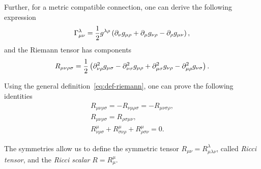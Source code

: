 Further, for a metric compatible connection, one can derive the following expression
\begin{equation}
    \Gamma^\lambda_{\mu\nu} = \frac{1}{2} g^{\lambda\rho} \left( \partial_\nu g_{\mu\rho} + \partial_\mu g_{\nu\rho} - \partial_\rho g_{\mu\nu} \right),
\end{equation}
and the Riemann tensor has components
\begin{equation}
    R_{\mu\nu\rho\sigma} = \frac{1}{2} \left( {\partial}^2_{\nu\rho} g_{\mu\sigma} - {\partial}^2_{\nu\sigma} g_{\mu\rho} + {\partial}^2_{\mu\sigma} g_{\nu\rho} - {\partial}^2_{\mu\rho} g_{\nu\sigma} \right) .
\end{equation}

Using the general definition~\eqref{eq:def-riemann}, one can prove the following identities
\begin{subequations}
\begin{gather}
    R_{\mu\nu\rho\sigma} = - R_{\nu\mu\rho\sigma} = - R_{\mu\nu\sigma\rho}, \\
    R_{\mu\nu\rho\sigma} = R_{\rho\sigma\mu\nu}, \\
    R^\mu_{\nu\rho\sigma} + R^\mu_{\sigma\nu\rho} + R^\mu_{\rho\sigma\nu} = 0.
\end{gather}
\end{subequations}

The symmetries allow us to define the symmetric tensor $R_{\mu\nu} = R^\lambda_{\mu\lambda\nu}$, called \emph{Ricci tensor}, and the \emph{Ricci scalar} $R = R^\mu_\mu$.
